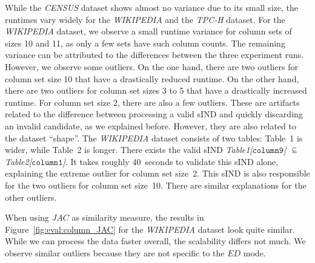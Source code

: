 While the \emph{CENSUS} dataset shows almost no variance due to its small size, the runtimes vary widely for the \emph{WIKIPEDIA} and the \emph{TPC-H} dataset.
For the \emph{WIKIPEDIA} dataset, we observe a small runtime variance for column sets of sizes 10 and 11, as only a few sets have such column counts.
The remaining variance can be attributed to the differences between the three experiment runs.
However, we observe some outliers.
On the one hand, there are two outliers for column set size 10 that have a drastically reduced runtime.
On the other hand, there are two outliers for column set sizes 3 to 5 that have a drastically increased runtime.
For column set size 2, there are also a few outliers.
These are artifacts related to the difference between processing a valid sIND and quickly discarding an invalid candidate, as we explained before.
However, they are also related to the dataset ``shape''.
The \emph{WIKIPEDIA} dataset consists of two tables:
Table~1 is wider, while Table~2 is longer.
There exists the valid sIND \emph{Table1[$\mathtt{column9}$]} $\simIND{}$ \emph{Table2[$\mathtt{column1}$]}.
It takes roughly 40~seconds to validate this sIND alone, explaining the extreme outlier for column set size~2.
This sIND is also responsible for the two outliers for column set size~10.
There are similar explanations for the other outliers.

When using $JAC$ as similarity measure, the results in Figure~\ref{fig:eval:column_JAC} for the \emph{WIKIPEDIA} dataset look quite similar.
While we can process the data faster overall, the scalability differs not much.
We observe similar outliers because they are not specific to the $ED$ mode.


